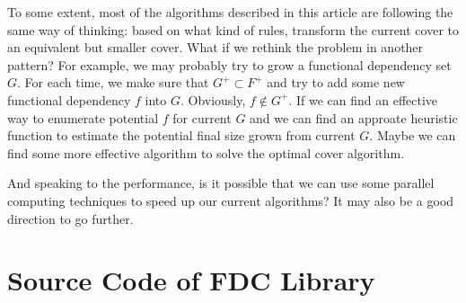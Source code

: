 \documentclass[11pt]{book}
\begin{document}
To some extent, most of the algorithms described in this article are following the same way of thinking: based on what kind of rules, transform the current cover to an equivalent but smaller cover. What if we rethink the problem in another pattern? For example, we may probably try to grow a functional dependency set $G$. For each time, we make sure that $G^{+} \subset F^{+}$ and try to add some new functional dependency $f$ into $G$. Obviously, $f \not \in G^{+}$. If we can find an effective way to enumerate potential $f$ for current $G$ and we can find an approate heuristic function to estimate the potential final size grown from current $G$. Maybe we can find some more effective algorithm to solve the optimal cover algorithm.

And speaking to the performance, is it possible that we can use some parallel computing techniques to speed up our current algorithms? It may also be a good direction to go further.

\renewcommand{\bibname}{References} %




\appendix

\chapter{Source Code of FDC Library}








\end{document}
